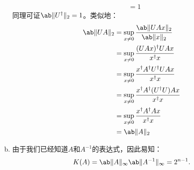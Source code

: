 \documentclass[12pt, a4paper, oneside]{article}
\begin{document}
\begin{enumerate}[(a)]
\begin{align*}
    &=1
\end{align*}
同理可证$\norm{U^\dagger}_2=1$。类似地：
\begin{align*}
    \norm{UA}_2 &= \sup_{x\neq 0}\frac{\norm{UAx}_2}{\norm{x}_2}\\
    &=\sup_{x\neq 0}\frac{(UAx)^\dagger UAx}{x^\dagger x}\\
    &=\sup_{x\neq 0}\frac{x^\dagger A^\dagger U^\dagger UAx}{x^\dagger x}\\
    &=\sup_{x\neq 0}\frac{x^\dagger A^\dagger (U^\dagger U) Ax}{x^\dagger x}\\
    &=\sup_{x\neq 0}\frac{x^\dagger A^\dagger Ax}{x^\dagger x}\\
    &=\norm{A}_2
\end{align*}
\item 由于我们已经知道$A$和$A^{-1}$的表达式，因此易知：
\begin{equation}
    K(A)=\norm{A}_\infty\norm{A^{-1}}_\infty = 2^{n-1}.
\end{equation}
\end{enumerate}
\end{document}
